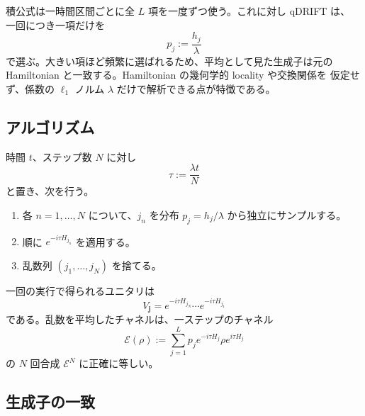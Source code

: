 \documentclass[uplatex,dvipdfmx,11pt,a4paper]{jsarticle}
\newcommand{\cE}{\mathcal{E}}
\begin{document}
積公式は一時間区間ごとに全 $L$ 項を一度ずつ使う。これに対し qDRIFT は、
一回につき一項だけを
\begin{equation}
  p_j:=\frac{h_j}{\lambda}
  \label{eq:qdrift-probability}
\end{equation}
で選ぶ。大きい項ほど頻繁に選ばれるため、平均として見た生成子は元の
Hamiltonian と一致する。Hamiltonian の幾何学的 locality や交換関係を
仮定せず、係数の $\ell_1$ ノルム $\lambda$ だけで解析できる点が特徴である。

\subsection{アルゴリズム}

時間 $t$、ステップ数 $N$ に対し
\begin{equation}
  \tau:=\frac{\lambda t}{N}
\end{equation}
と置き、次を行う。
\begin{enumerate}
  \item 各 $n=1,\ldots,N$ について、$j_n$ を分布
    $p_j=h_j/\lambda$ から独立にサンプルする。
  \item 順に $e^{-i\tau H_{j_n}}$ を適用する。
  \item 乱数列 $(j_1,\ldots,j_N)$ を捨てる。
\end{enumerate}
一回の実行で得られるユニタリは
\begin{equation}
  V_{\bm j}=e^{-i\tau H_{j_N}}\cdots e^{-i\tau H_{j_1}}
\end{equation}
である。乱数を平均したチャネルは、一ステップのチャネル
\begin{equation}
  \cE(\rho)
  :=\sum_{j=1}^{L}p_j
    e^{-i\tau H_j}\rho e^{i\tau H_j}
  \label{eq:qdrift-one-step-channel}
\end{equation}
の $N$ 回合成 $\cE^N$ に正確に等しい。

\subsection{生成子の一致}
\end{document}
